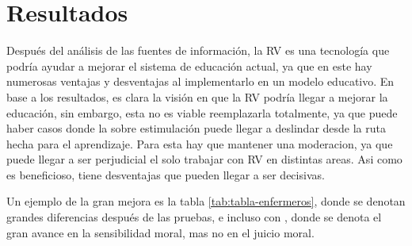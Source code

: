 \section{Resultados}

Después del análisis de las fuentes de información, la RV es una tecnología que podría ayudar a mejorar el sistema de educación actual, ya que en este hay numerosas ventajas y desventajas al implementarlo en un modelo educativo.
En base a los resultados, es clara la visión en que la RV podría llegar a mejorar la educación, sin embargo, esta no es viable reemplazarla totalmente, ya que puede haber casos donde la sobre estimulación puede llegar a deslindar desde la ruta hecha para el aprendizaje. Para esta hay que mantener una moderacion, ya que puede llegar a ser perjudicial el solo trabajar con RV en distintas areas. Asi como es beneficioso, tiene desventajas que pueden llegar a ser decisivas.



Un ejemplo de la gran mejora es la tabla \ref{tab:tabla-enfermeros}, donde se denotan grandes diferencias despu{\'e}s de las pruebas, e incluso con \textcite{SHIM2023100010}, donde se denota el gran avance en la sensibilidad moral, mas no en el juicio moral.


